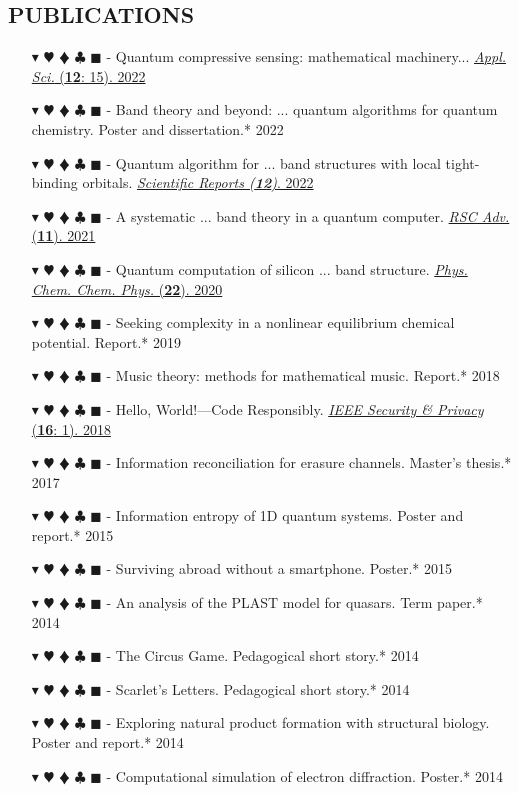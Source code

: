 \documentclass[overlapped, 10pt]{res} %
\newcommand{\physics}{$\blacktriangledown$}
\newcommand{\biochem}{$\varheartsuit$}
\newcommand{\shannon}{$\vardiamondsuit$}
\newcommand{\classic}{$\clubsuit$}
\newcommand{\quantum}{$\blacksquare$}
\newcommand{\physicscolor}{\color{YellowOrange}}
\newcommand{\biochemcolor}{\color{Emerald}}
\newcommand{\shannoncolor}{\color{Goldenrod}}
\newcommand{\classiccolor}{\color{Cyan}}
\newcommand{\quantumcolor}{\color{RedOrange}}
\newcommand{\tag}[1]{
    {\IfSubStr{#1}{\physics}{\physicscolor}{\color{White}}\physics}
    {\IfSubStr{#1}{\biochem}{\biochemcolor}{\color{White}}\biochem}
    {\IfSubStr{#1}{\shannon}{\shannoncolor}{\color{White}}\shannon}
    {\IfSubStr{#1}{\classic}{\classiccolor}{\color{White}}\classic}
    {\IfSubStr{#1}{\quantum}{\quantumcolor}{\color{White}}\quantum}
}
\begin{document}
\begin{resume}
\section{PUBLICATIONS}
\begin{itemize} \itemsep -2pt %
\item[\tag{\shannon\quantum}-] Quantum compressive sensing: mathematical machinery...
    \hfill \href{https://arxiv.org/abs/2204.13035}{\textit{Appl. Sci.} (\textbf{12}: 15). 2022}
\item[\tag{\physics\biochem\shannon\quantum}-] Band theory and beyond: ... quantum algorithms for quantum chemistry.
    \hfill Poster and dissertation.* 2022
\item[\tag{\physics\quantum}-] Quantum algorithm for ... band structures with local tight-binding orbitals.
    \hfill \href{https://doi.org/10.21203/rs.3.rs-1318951/v1}{\textit{Scientific Reports (\textbf{12})}. 2022}
\item[\tag{\physics\quantum}-] A systematic ... band theory in a quantum computer.
    \hfill \href{https://arxiv.org/abs/2104.03409}{\textit{RSC Adv.} (\textbf{11}). 2021}
\item[\tag{\physics\quantum}-] Quantum computation of silicon ... band structure.
    \hfill \href{https://arxiv.org/abs/2006.03807}{\textit{Phys. Chem. Chem. Phys.} (\textbf{22}). 2020}
\item[\tag{\biochem}-] Seeking complexity in a nonlinear equilibrium chemical potential.
    \hfill Report.* 2019
\item[\tag{}-] Music theory: methods for mathematical music.
    \hfill Report.* 2018
\item[\tag{\classic}-] Hello, World!—Code Responsibly.
    \hfill \href{https://ieeexplore.ieee.org/document/8283486}{\textit{IEEE Security \& Privacy} (\textbf{16}: 1). 2018}
\item[\tag{\shannon\classic}-] Information reconciliation for erasure channels.
    \hfill Master's thesis.* 2017
\item[\tag{\physics\shannon\classic}-] Information entropy of 1D quantum systems.
    \hfill Poster and report.* 2015
\item[\tag{}-] Surviving abroad without a smartphone.
    \hfill Poster.* 2015
\item[\tag{\physics}-] An analysis of the PLAST model for quasars.
    \hfill Term paper.* 2014
\item[\tag{\shannon}-] The Circus Game.
    \hfill Pedagogical short story.* 2014
\item[\tag{\physics}-] Scarlet's Letters.
    \hfill Pedagogical short story.* 2014
\item[\tag{\biochem}-] Exploring natural product formation with structural biology.
    \hfill Poster and report.* 2014
\item[\tag{\physics\classic}-] Computational simulation of electron diffraction.
    \hfill Poster.* 2014
\end{itemize}


\end{resume}
\end{document}
